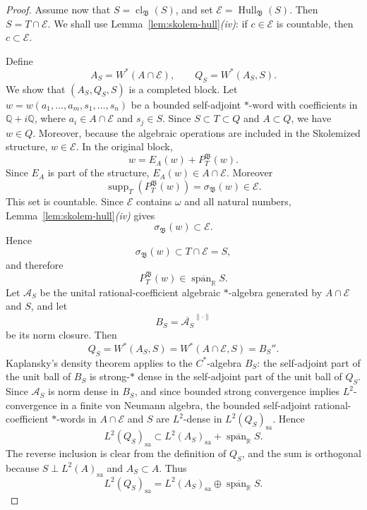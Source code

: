 \documentclass[11pt,letterpaper,reqno]{amsart}
\theoremstyle{definition}
\numberwithin{equation}{section}
\newcommand{\sa}{\mathrm{sa}}
\newcommand{\RR}{\mathbb R}
\newcommand{\cl}{\operatorname{cl}}
\DeclareMathOperator{\spanop}{span}
\DeclareMathOperator{\supp}{supp}
\DeclareMathOperator{\Hull}{Hull}
\begin{document}
\begin{proof}
Assume now that $S=\cl_{\mathfrak B}(S)$, and set
$\mathcal E=\Hull_{\mathfrak B}(S)$.  Then $S=T\cap\mathcal E$.  We shall use
Lemma~\ref{lem:skolem-hull}\emph{(iv)}: if $c\in\mathcal E$ is countable, then
$c\subset\mathcal E$.

Define
\[
   A_S=W^*(A\cap\mathcal E),
   \qquad
   Q_S=W^*(A_S,S).
\]
We show that $(A_S,Q_S,S)$ is a completed block. Let \(w=w(a_1,\ldots,a_m,s_1,\ldots,s_n)\) be a bounded self-adjoint
\(*\)-word with coefficients in \(\mathbb Q+i\mathbb Q\), where
\(a_i\in A\cap\mathcal E\) and \(s_j\in S\). Since
\(S\subset T\subset Q\) and \(A\subset Q\), we have \(w\in Q\).  Moreover,
because the algebraic operations are included in the Skolemized structure,
\(w\in\mathcal E\).  In the original block,
\[
   w=E_A(w)+P_T^{\mathfrak B}(w).
\]
Since $E_A$ is part of the structure, $E_A(w)\in A\cap\mathcal E$. Moreover
\[
   \supp_T(P_T^{\mathfrak B}(w))=\sigma_{\mathfrak B}(w)\in\mathcal E .
\]
This set is countable.  Since \(\mathcal E\) contains \(\omega\) and all
natural numbers, Lemma~\ref{lem:skolem-hull}\emph{(iv)} gives
\[
   \sigma_{\mathfrak B}(w)\subset\mathcal E .
\]
Hence
\[
   \sigma_{\mathfrak B}(w)\subset T\cap\mathcal E=S,
\]
and therefore
\[
   P_T^{\mathfrak B}(w)\in\overline{\spanop_{\RR}}S.
\]
Let \(\mathcal A_S\) be the unital rational-coefficient algebraic
\(*\)-algebra generated by \(A\cap\mathcal E\) and \(S\), and let
\[
   B_S=\overline{\mathcal A_S}^{\|\cdot\|}
\]
be its norm closure.  Then
\[
   Q_S=W^*(A_S,S)=W^*(A\cap\mathcal E,S)=B_S'' .
\]
Kaplansky's density theorem applies to the $C^*$-algebra $B_S$: the
self-adjoint part of the unit ball of $B_S$ is strong-$*$ dense in the
self-adjoint part of the unit ball of $Q_S$.  Since $\mathcal A_S$ is norm
dense in $B_S$, and since bounded strong convergence implies
$L^2$-convergence in a finite von Neumann algebra, the bounded self-adjoint rational-coefficient \(*\)-words in
\(A\cap\mathcal E\) and \(S\) are \(L^2\)-dense in
\(L^2(Q_S)_{\sa}\). Hence
\[
   L^2(Q_S)_{\sa}\subset L^2(A_S)_{\sa}+\overline{\spanop_{\RR}}S.
\]
The reverse inclusion is clear from the definition of $Q_S$, and the sum is orthogonal because $S\perp L^2(A)_{\sa}$ and $A_S\subset A$.  Thus
\[
   L^2(Q_S)_{\sa}=L^2(A_S)_{\sa}\oplus\overline{\spanop_{\RR}}S.
\]
\end{proof}
\end{document}
